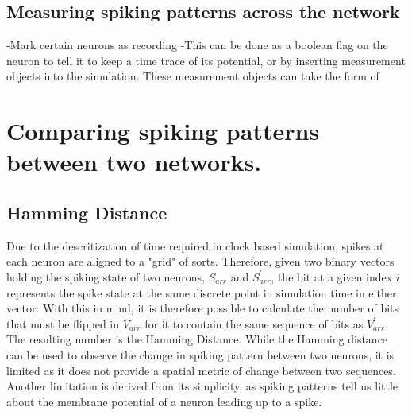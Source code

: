 \subsection{Measuring spiking patterns across the network}

-Mark certain neurons as recording
-This can be done as a boolean flag on the neuron to tell it to keep a time
trace of its potential, or by inserting measurement objects into the simulation.
These measurement objects can take the form of 

\section{Comparing spiking patterns between two networks.}

\subsection{Hamming Distance}
Due to the descritization of time required in clock based simulation, spikes at
each neuron are aligned to a "grid" of sorts. Therefore, given two binary
vectors holding the spiking state of two neurons, $S_{arr}$ and $S^\prime_{arr}$, the bit at a given index $i$ represents
the spike state at the same discrete point in simulation time in either vector.
With this in mind, it is therefore possible to calculate the number of bits
that must be flipped in $V_{arr}$ for it to contain the same sequence of bits as
$V^\prime_{arr}$. The resulting number is the Hamming Distance. While the
Hamming distance can be used to observe the change in spiking pattern between
two neurons, it is limited as it does not provide a spatial metric of change
between two sequences. Another limitation is derived from its simplicity, as
spiking patterns tell us little about the membrane potential of a neuron leading
up to a spike.

